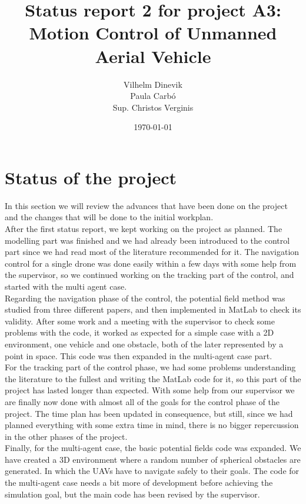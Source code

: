 \documentclass{article}
\title{Status report 2 for project A3: Motion Control of Unmanned Aerial Vehicle}
\author{Vilhelm Dinevik \\ Paula Carbó \\ Sup. Christos Verginis}
\date{\today}
\begin{document}
	\maketitle
	
	\bigskip
	\tableofcontents
	\newpage
\section{Status of the project}
In this section we will review the advances that have been done on the project and the changes that will be done to the initial workplan.  \\

After the first status report, we kept working on the project as planned. The modelling part was finished and we had already been introduced to the control part since we had read most of the literature recommended for it. The navigation control for a single drone was done easily within a few days with some help from the supervisor, so we continued working on the tracking part of the control, and started with the multi agent case. \\

Regarding the navigation phase of the control, the potential field method was studied from three different papers, and then implemented in MatLab to check its validity. After some work and a meeting with the supervisor to check some problems with the code, it worked as expected for a simple case with a 2D environment, one vehicle and one obstacle, both of the later represented by a point in space. This code was then expanded in the multi-agent case part. \\

For the tracking part of the control phase, we had some problems understanding the literature to the fullest and writing the MatLab code for it, so this part of the project has lasted longer than expected. With some help from our supervisor we are finally now done with almost all of the goals for the control phase of the project. The time plan has been updated in consequence, but still, since we had planned everything with some extra time in mind, there is no bigger repercussion in the other phases of the project. \\

Finally, for the multi-agent case, the basic potential fields code was expanded. We have created a 3D environment where a random number of spherical obstacles are generated. In which the UAVs have to navigate safely to their goals. The code for the multi-agent case needs a bit more of development before achieving the simulation goal, but the main code has been revised by the supervisor. \\
\end{document}
